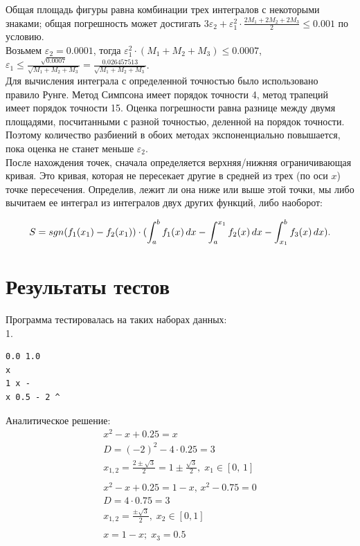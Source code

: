 \documentclass[a4paper,12pt,titlepage,finall]{article}
\begin{document}
Общая площадь фигуры равна комбинации трех интегралов с некоторыми знаками; общая погрешность может достигать $3\varepsilon_2 + \varepsilon_1^2 \cdot \frac{2M_1 + 2M_2 + 2M_3}{2} \leq 0.001$ по условию.\\
Возьмем $\varepsilon_2 = 0.0001$, тогда $\varepsilon_1^2 \cdot (M_1 + M_2 + M_3) \leq 0.0007$, $\varepsilon_1 \leq \frac{\sqrt{0.0007}}{\sqrt{M_1 + M_2 + M_3}} = \frac{0.026457513}{\sqrt{M_1 + M_2 + M_3}}$.\\

Для вычисления интеграла с определенной точностью было использовано правило Рунге. Метод Симпсона имеет порядок точности 4, метод трапеций имеет порядок точности 15. Оценка погрешности равна разнице между двумя площадями, посчитанными с разной точностью, деленной на порядок точности. Поэтому количество разбиений в обоих методах экспоненциально повышается, пока оценка не станет меньше $\varepsilon_2$. ~\cite{math}\\

После нахождения точек, сначала определяется верхняя/нижняя ограничивающая кривая. Это кривая, которая не пересекает другие в средней из трех (по оси $x$) точке пересечения. Определив, лежит ли она ниже или выше этой точки, мы либо вычитаем ее интеграл из интегралов двух других функций, либо наоборот:

\[
S = sgn(f_1(x_1) - f_2(x_1)) \cdot (\int_a^b f_1(x)\,dx - \int_a^{x_1} f_2(x)\,dx - \int_{x_1}^b f_3(x)\,dx).\\\\
\]


\newpage

\section{Результаты тестов}

Программа тестировалась на таких наборах данных:\\
1.
\begin{verbatim}
0.0 1.0
x
1 x -
x 0.5 - 2 ^
\end{verbatim}
Аналитическое решение:
$$
\begin{gathered}
    x^2 - x + 0.25 = x\\D = (-2)^2-4\cdot0.25=3\\x_{1,2}=\frac{2\pm \sqrt{3}}{2}=1 \pm \frac{\sqrt{3}}{2},\; x_1 \in [0,\,1]\\\\
    x^2 - x + 0.25 = 1-x,\,x^2-0.75=0\\D = 4\cdot0.75=3\\x_{1,2}=\frac{\pm \sqrt{3}}{2},\;x_2 \in [0, 1]\\\\
x = 1-x;\; x_3=0.5
\end{gathered}
$$
\end{document}

